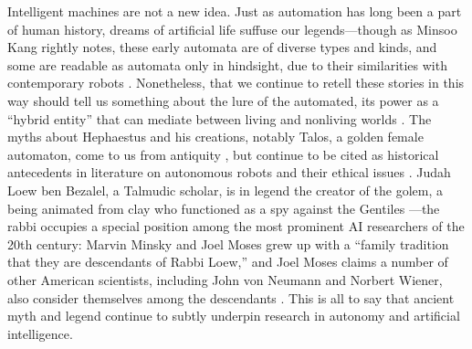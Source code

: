

Intelligent machines are not a new idea. Just as automation has long
been a part of human history, dreams of artificial life suffuse our
legends---though as Minsoo Kang
rightly notes, these early automata are of diverse types and kinds,
and some are readable as automata only in hindsight, due to their
similarities with contemporary robots \cite[p. 15]{kang}.
Nonetheless, that we continue 
to retell these stories in this way should tell us something about the
lure of the automated, its power as a ``hybrid entity'' that can
mediate between living and nonliving worlds \cite[p. 19]{kang}.
The myths about Hephaestus and 
his creations, notably Talos, a golden female automaton, come to us
from antiquity \cite[Ch. 1]{mccorduck}, but continue to be cited as
historical antecedents in 
literature on autonomous robots and their ethical issues \cite[p.
  3]{patrickLin}. Judah Loew ben Bezalel, a Talmudic
scholar, is in legend the 
creator of the golem, a being animated from clay who functioned as a
spy against the Gentiles \cite[Ch. 1]{mccorduck}---the rabbi occupies
a special position among the most 
prominent AI researchers of the 20th century: Marvin Minsky and Joel
Moses grew up with a ``family tradition 
that they are descendants of Rabbi Loew,'' and Joel Moses claims a number of
other American scientists, including John von Neumann and Norbert
Wiener, also consider themselves among the descendants \cite[Ch.
  1]{mccorduck}. This is all 
to say that ancient myth and legend continue to subtly underpin
research in autonomy and artificial intelligence.

